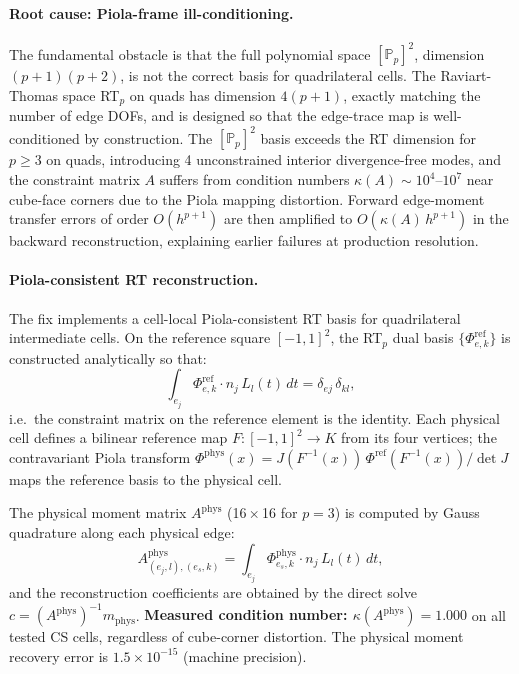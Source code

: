 \documentclass[11pt]{article}
\begin{document}
\paragraph{Root cause: Piola-frame ill-conditioning.}
The fundamental obstacle is that the full polynomial space \([\mathbb{P}_p]^2\),
dimension \((p+1)(p+2)\), is not the correct basis for quadrilateral cells.
The Raviart-Thomas space RT\(_p\) on quads has dimension \(4(p+1)\), exactly
matching the number of edge DOFs, and is designed so that the edge-trace map is
well-conditioned by construction.  The \([\mathbb{P}_p]^2\) basis exceeds the
RT dimension for \(p\geq 3\) on quads, introducing 4 unconstrained interior
divergence-free modes, and the constraint matrix \(A\) suffers from condition
numbers \(\kappa(A)\sim 10^4\)--\(10^7\) near cube-face corners due to the
Piola mapping distortion.  Forward edge-moment transfer errors of order
\(O(h^{p+1})\) are then amplified to \(O(\kappa(A)\,h^{p+1})\) in the
backward reconstruction, explaining earlier failures at production resolution.

\paragraph{Piola-consistent RT reconstruction.}
The fix implements a cell-local Piola-consistent RT basis for quadrilateral
intermediate cells.  On the reference square \([-1,1]^2\), the RT\(_p\) dual
basis \(\{\Phi_{e,k}^{\mathrm{ref}}\}\) is constructed analytically so that:
\[
  \int_{e_j} \Phi_{e,k}^{\mathrm{ref}} \cdot n_j\, L_l(t)\,dt = \delta_{ej}\,\delta_{kl},
\]
i.e.\ the constraint matrix on the reference element is the identity.  Each
physical cell defines a bilinear reference map \(F:[-1,1]^2\to K\) from its four
vertices; the contravariant Piola transform
\(\Phi^{\mathrm{phys}}(x) = J(F^{-1}(x))\,\Phi^{\mathrm{ref}}(F^{-1}(x))/\det J\)
maps the reference basis to the physical cell.

The physical moment matrix \(A^{\mathrm{phys}}\) (16\,\(\times\)\,16 for \(p=3\)) is
computed by Gauss quadrature along each physical edge:
\[
  A^{\mathrm{phys}}_{(e_j,l),(e_s,k)}
    = \int_{e_j} \Phi^{\mathrm{phys}}_{e_s,k}\cdot n_j\,L_l(t)\,dt,
\]
and the reconstruction coefficients are obtained by the direct solve
\(c = (A^{\mathrm{phys}})^{-1} m_{\mathrm{phys}}\).  \textbf{Measured condition
number: \(\kappa(A^{\mathrm{phys}})=1.000\)} on all tested CS cells, regardless
of cube-corner distortion.  The physical moment recovery error is
\(1.5\times10^{-15}\) (machine precision).
\end{document}
